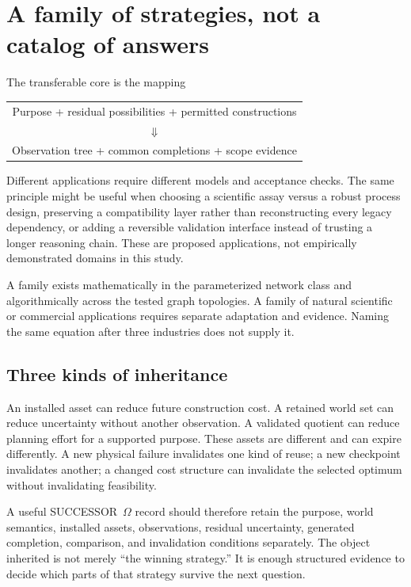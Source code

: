 \documentclass[11pt,letterpaper]{article}
\newcommand{\Om}{SUCCESSOR~$\Omega$}
\theoremstyle{remark}\newtheorem{remark}{Remark}[section]
\begin{document}
\section{A family of strategies, not a catalog of answers}
\label{sec:family}
The transferable core is the mapping
\begin{center}
\begin{tabular}{c}
Purpose + residual possibilities + permitted constructions\\[2pt]
$\Downarrow$\\[2pt]
Observation tree + common completions + scope evidence
\end{tabular}
\end{center}
Different applications require different models and acceptance checks. The same principle might be useful when choosing a scientific assay versus a robust process design, preserving a compatibility layer rather than reconstructing every legacy dependency, or adding a reversible validation interface instead of trusting a longer reasoning chain. These are proposed applications, not empirically demonstrated domains in this study.

A family exists mathematically in the parameterized network class and algorithmically across the tested graph topologies. A family of natural scientific or commercial applications requires separate adaptation and evidence. Naming the same equation after three industries does not supply it.

\subsection{Three kinds of inheritance}
An installed asset can reduce future construction cost. A retained world set can reduce uncertainty without another observation. A validated quotient can reduce planning effort for a supported purpose. These assets are different and can expire differently. A new physical failure invalidates one kind of reuse; a new checkpoint invalidates another; a changed cost structure can invalidate the selected optimum without invalidating feasibility.

A useful \Om{} record should therefore retain the purpose, world semantics, installed assets, observations, residual uncertainty, generated completion, comparison, and invalidation conditions separately. The object inherited is not merely ``the winning strategy.'' It is enough structured evidence to decide which parts of that strategy survive the next question.
\end{document}
